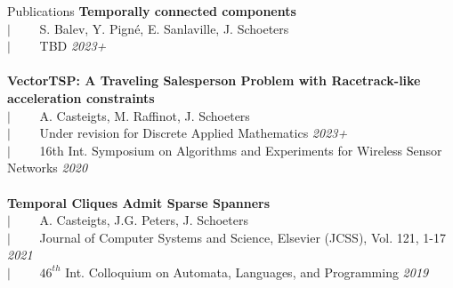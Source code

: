\documentclass[french]{resume} %
\begin{document}
	\begin{rSection}{Publications }
		{\bf Temporally connected components}\\
		$| \qquad$ S. Balev, Y. Pigné, E. Sanlaville, J. Schoeters\\
		$| \qquad$ TBD \hfill {\em 2023+}
		\\
		\\
		{\bf VectorTSP: A Traveling Salesperson Problem with Racetrack-like acceleration constraints}\\
		$| \qquad$ A. Casteigts, M. Raffinot, J. Schoeters\\
		$| \qquad$ Under revision for Discrete Applied Mathematics \hfill {\em 2023+}\\
		$| \qquad$ 16th Int. Symposium on Algorithms and Experiments for Wireless Sensor Networks \hfill {\em 2020}
		\\
		\\
		{\bf Temporal Cliques Admit Sparse Spanners}\\
		$| \qquad$ A. Casteigts, J.G. Peters, J. Schoeters\\
		$| \qquad$ Journal of Computer Systems and Science, Elsevier (JCSS), Vol. 121, 1-17 \hfill {\em 2021}\\
		$| \qquad$ $46^{th}$ Int. Colloquium on Automata, Languages, and Programming \hfill {\em 2019}
	\end{rSection}
	
	
\end{document}
